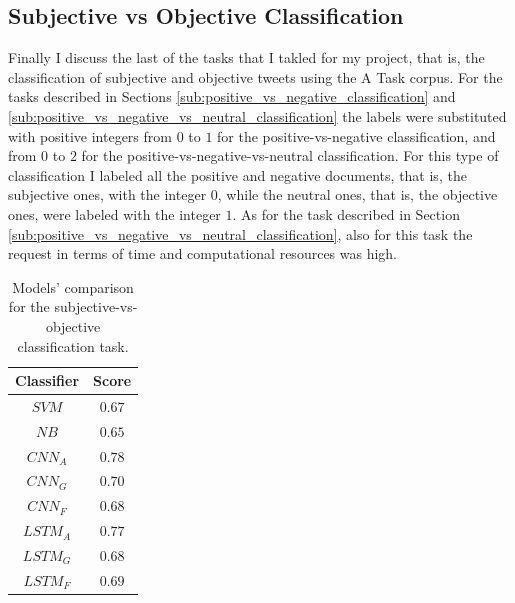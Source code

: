 \documentclass[11pt,twocolumn]{article}
\begin{document}
        \subsection{Subjective vs Objective Classification} %
        \label{sub:subjective_vs_objective_classification}
            Finally I discuss the last of the tasks that I takled for my project, that is, the
            classification of subjective and objective tweets using the A Task corpus. For the tasks described in
            Sections \ref{sub:positive_vs_negative_classification} and
            \ref{sub:positive_vs_negative_vs_neutral_classification} the labels were substituted with
            positive integers from $0$ to $1$ for the positive-vs-negative classification, and from $0$ to
            $2$ for the positive-vs-negative-vs-neutral classification. For this type of classification I
            labeled all the positive and negative documents, that is, the subjective ones, with the integer
            $0$, while the neutral ones, that is, the objective ones, were labeled with the integer $1$.
            As for the task described in Section \ref{sub:positive_vs_negative_vs_neutral_classification},
            also for this task the request in terms of time and computational resources was high.

            \begin{table}[h]
                \centering
                \begin{tabular}{| c | c |}
                    \hline
                    \textbf{Classifier} & \textbf{Score} \\
                    \hline
                    $SVM$ & $0.67$ \\
                    \hline
                    $NB$ & $0.65$ \\
                    \hline
                    $CNN_A$ & $0.78$ \\
                    \hline
                    $CNN_G$ & $0.70$ \\
                    \hline
                    $CNN_F$ & $0.68$ \\
                    \hline
                    $LSTM_A$ & $0.77$ \\
                    \hline
                    $LSTM_G$ & $0.68$ \\
                    \hline
                    $LSTM_F$ & $0.69$ \\
                    \hline
                \end{tabular}
                \caption{Models' comparison for the subjective-vs-objective classification task.}
                \label{tab:so_comparison}
            \end{table}
\end{document}
